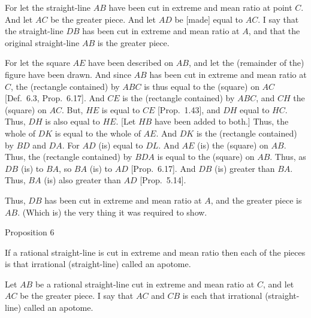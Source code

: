 \centerline{}

For let the straight-line $AB$ have been cut in extreme and mean ratio
at point $C$. And let $AC$ be the greater piece. And let $AD$
be [made] equal to $AC$. I say that the straight-line $DB$ has been cut in extreme and
mean ratio at $A$, and that the original straight-line $AB$ is
the greater piece.

For let the square $AE$ have been described on $AB$, and
let the (remainder of the) figure have been drawn. And since
$AB$ has been cut in extreme and mean ratio at $C$, the (rectangle
contained) by $ABC$ is thus equal to the (square) on $AC$
[Def.~6.3, Prop.~6.17].  And $CE$ is the (rectangle contained)
by  $ABC$,  and $CH$ the (square) on $AC$. But, $HE$ is equal
to $CE$ [Prop.~1.43], and $DH$ equal to $HC$. Thus, $DH$ is also
equal to $HE$. [Let $HB$ have been added to both.] Thus, the whole
of $DK$ is equal to the whole of $AE$. And $DK$ is the
(rectangle contained) by $BD$ and $DA$. For $AD$ (is) equal to
$DL$. And $AE$ (is) the (square) on $AB$.  Thus, the (rectangle
contained) by $BDA$ is equal to the (square) on $AB$. Thus, as
$DB$ (is) to $BA$, so $BA$ (is) to $AD$ [Prop.~6.17]. And
$DB$ (is) greater than $BA$. Thus, $BA$ (is) also greater
than $AD$ [Prop.~5.14].

Thus, $DB$ has been cut in extreme and mean ratio at $A$, and the
greater piece is $AB$. (Which is) the very thing it was required to show.


\begin{center}
{\large Proposition 6}
\end{center}

If a rational straight-line is cut in extreme and mean ratio then each of
the pieces is that irrational (straight-line) called an apotome.

\epsfysize=0.3in
\centerline{}

Let  $AB$ be a rational straight-line cut in extreme and mean ratio
at $C$, and let $AC$ be the greater piece. I say that  $AC$ and
$CB$ is each that irrational (straight-line) called an apotome.

